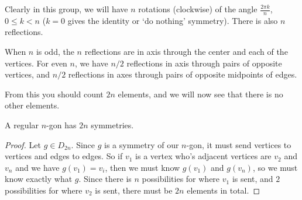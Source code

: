 \documentclass[a4paper]{scrartcl}
\begin{document}
Clearly in this group, we will have $n$ rotations (clockwise) of the angle $\frac{2 \pi k}{n}$, $0 \leq k < n$ ($k = 0$ gives the identity or `do nothing' symmetry). There is also $n$ reflections.
\begin{center}
	


\end{center}
When $n$ is odd, the $n$ reflections are in axis through the center and each of the vertices. For even $n$, we have $n/2$ reflections in axis through pairs of opposite vertices, and $n / 2$ reflections in axes through pairs of opposite midpoints of edges.

From this you should count $2n$ elements, and we will now see that there is no other elements.

\begin{proposition}
	A regular $n$-gon has $2n$ symmetries.
\end{proposition}
\begin{proof}
	Let $g \in D_{2n}$. Since $g$ is a symmetry of our $n$-gon, it must send vertices to vertices and edges to edges. So if $v_1$ is a vertex who's adjacent vertices are $v_2$ and $v_n$ and we have $g(v_1) = v_i$, then we must know $g(v_1)$ and $g(v_n)$, so we must know exactly what $g$. Since there is $n$ possibilities for where $v_1$ is sent, and $2$ possibilities for where $v_2$ is sent, there must be $2n$ elements in total.
\end{proof}
\end{document}
